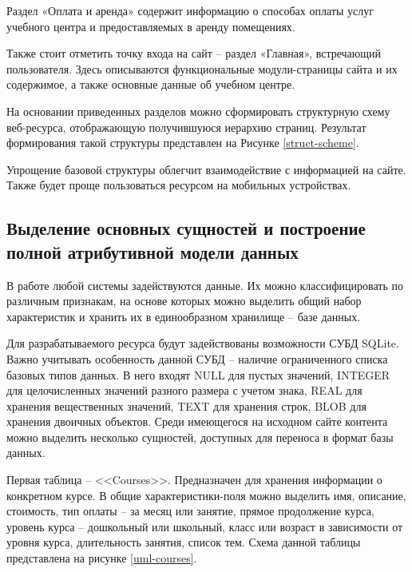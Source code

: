 Раздел «Оплата и аренда» содержит информацию о способах оплаты услуг учебного центра и предоставляемых в аренду помещениях.

Также стоит отметить точку входа на сайт -- раздел «Главная», встречающий пользователя.
Здесь описываются функциональные модули-страницы сайта и их содержимое, а также основные данные об учебном центре.

На основании приведенных разделов можно сформировать структурную схему веб-ресурса, отображающую получившуюся иерархию страниц.
Результат формирования такой структуры представлен на Рисунке \ref{struct-scheme}.


Упрощение базовой структуры облегчит взаимодействие с информацией на сайте.
Также будет проще пользоваться ресурсом на мобильных устройствах.


\subsection{Выделение основных сущностей и построение полной атрибутивной модели данных}\label{Выделение основных сущностей и построение полной атрибутивной модели данных}

В работе любой системы задействуются данные.
Их можно классифицировать по различным признакам, на основе которых можно выделить общий набор характеристик и хранить их в единообразном хранилище -- базе данных.

Для разрабатываемого ресурса будут задействованы возможности СУБД SQLite.
Важно учитывать особенность данной СУБД -- наличие ограниченного списка базовых типов данных.
В него входят NULL для пустых значений, INTEGER для целочисленных значений разного размера с учетом знака, REAL для хранения вещественных значений, TEXT для хранения строк, BLOB для хранения двоичных объектов.
Среди имеющегося на исходном сайте контента можно выделить несколько сущностей, доступных для переноса в формат базы данных.

Первая таблица -- <<Courses>>.
Предназначен для хранения информации о конкретном курсе.
В общие характеристики-поля можно выделить имя, описание, стоимость, тип оплаты -- за месяц или занятие, прямое продолжение курса, уровень курса -- дошкольный или школьный, класс или возраст в зависимости от уровня курса, длительность занятия, список тем.
Схема данной таблицы представлена на рисунке \ref{uml-courses}.

